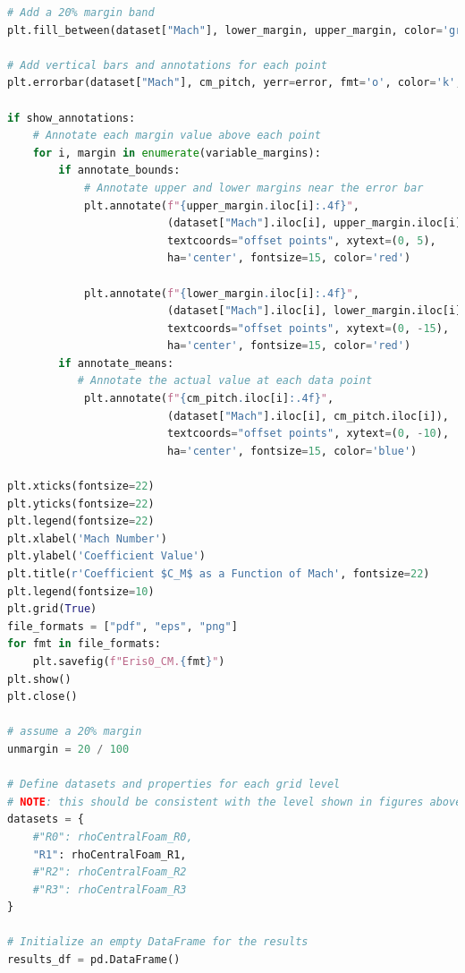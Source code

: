 \documentclass[12pt]{article}
\begin{document}
\begin{lstlisting}[language=Python, caption=Python script used to post-process numerical solutions. To report bugs email to: lorenzo.campoli@gspace.com, label=lst:pp]
# Add a 20% margin band
plt.fill_between(dataset["Mach"], lower_margin, upper_margin, color='green', alpha=0.2, label='20% Margin Band')

# Add vertical bars and annotations for each point
plt.errorbar(dataset["Mach"], cm_pitch, yerr=error, fmt='o', color='k', capsize=10, label='Local Margin')

if show_annotations:
    # Annotate each margin value above each point
    for i, margin in enumerate(variable_margins):
        if annotate_bounds:
            # Annotate upper and lower margins near the error bar
            plt.annotate(f"{upper_margin.iloc[i]:.4f}", 
                         (dataset["Mach"].iloc[i], upper_margin.iloc[i]), 
                         textcoords="offset points", xytext=(0, 5),
                         ha='center', fontsize=15, color='red')
            
            plt.annotate(f"{lower_margin.iloc[i]:.4f}", 
                         (dataset["Mach"].iloc[i], lower_margin.iloc[i]), 
                         textcoords="offset points", xytext=(0, -15),
                         ha='center', fontsize=15, color='red')
        if annotate_means:
           # Annotate the actual value at each data point
            plt.annotate(f"{cm_pitch.iloc[i]:.4f}", 
                         (dataset["Mach"].iloc[i], cm_pitch.iloc[i]), 
                         textcoords="offset points", xytext=(0, -10),
                         ha='center', fontsize=15, color='blue')
        
plt.xticks(fontsize=22)
plt.yticks(fontsize=22)
plt.legend(fontsize=22)
plt.xlabel('Mach Number')
plt.ylabel('Coefficient Value')
plt.title(r'Coefficient $C_M$ as a Function of Mach', fontsize=22)
plt.legend(fontsize=10)
plt.grid(True)
file_formats = ["pdf", "eps", "png"]
for fmt in file_formats:
    plt.savefig(f"Eris0_CM.{fmt}")
plt.show()
plt.close()

# assume a 20% margin
unmargin = 20 / 100

# Define datasets and properties for each grid level
# NOTE: this should be consistent with the level shown in figures above
datasets = {
    #"R0": rhoCentralFoam_R0,
    "R1": rhoCentralFoam_R1,
    #"R2": rhoCentralFoam_R2
    #"R3": rhoCentralFoam_R3
}

# Initialize an empty DataFrame for the results
results_df = pd.DataFrame()


\end{lstlisting}
\end{document}
